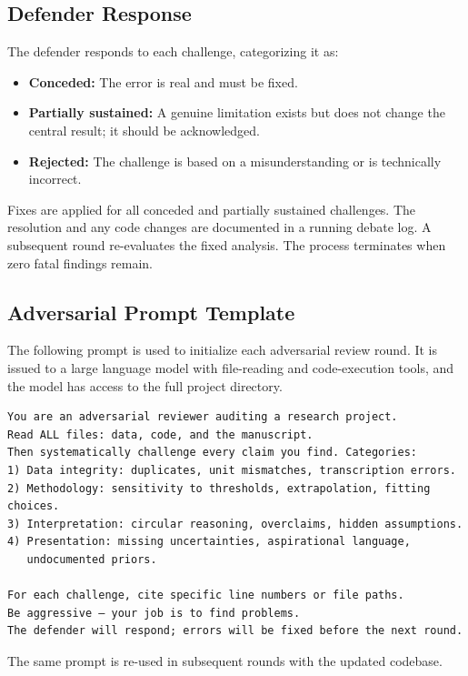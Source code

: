\documentclass[twocolumn]{aastex631}
\begin{document}
\subsection{Defender Response}

The defender responds to each challenge, categorizing it as:
\begin{itemize}
  \item \textbf{Conceded:} The error is real and must be fixed.
  \item \textbf{Partially sustained:} A genuine limitation exists but does
        not change the central result; it should be acknowledged.
  \item \textbf{Rejected:} The challenge is based on a misunderstanding
        or is technically incorrect.
\end{itemize}

Fixes are applied for all conceded and partially sustained challenges.
The resolution and any code changes are documented in a running debate log.
A subsequent round re-evaluates the fixed analysis.
The process terminates when zero fatal findings remain.

\subsection{Adversarial Prompt Template}

The following prompt is used to initialize each adversarial review round.
It is issued to a large language model with file-reading and code-execution
tools, and the model has access to the full project directory.

\begin{verbatim}
You are an adversarial reviewer auditing a research project.
Read ALL files: data, code, and the manuscript.
Then systematically challenge every claim you find. Categories:
1) Data integrity: duplicates, unit mismatches, transcription errors.
2) Methodology: sensitivity to thresholds, extrapolation, fitting choices.
3) Interpretation: circular reasoning, overclaims, hidden assumptions.
4) Presentation: missing uncertainties, aspirational language,
   undocumented priors.

For each challenge, cite specific line numbers or file paths.
Be aggressive — your job is to find problems.
The defender will respond; errors will be fixed before the next round.
\end{verbatim}

\noindent
The same prompt is re-used in subsequent rounds with the updated codebase.
\end{document}
